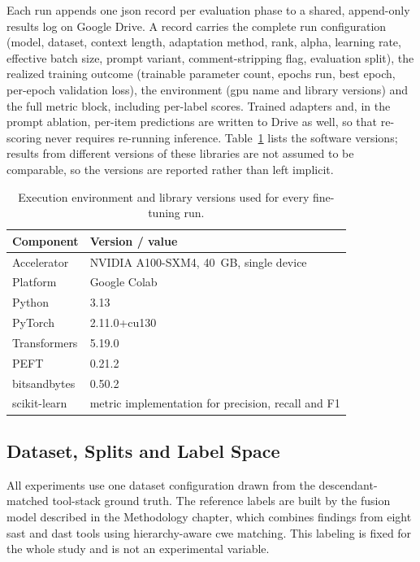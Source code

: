 Each run appends one \gls{json} record per evaluation phase to a shared, append-only results log on Google Drive. A record carries the complete run configuration (model, dataset, context length, adaptation method, rank, alpha, learning rate, effective batch size, prompt variant, comment-stripping flag, evaluation split), the realized training outcome (trainable parameter count, epochs run, best epoch, per-epoch validation loss), the environment (\gls{gpu} name and library versions) and the full metric block, including per-label scores. Trained adapters and, in the prompt ablation, per-item predictions are written to Drive as well, so that re-scoring never requires re-running inference. Table~\ref{tab:software_env} lists the software versions; results from different versions of these libraries are not assumed to be comparable, so the versions are reported rather than left implicit.

\begin{table}[H]
\centering
\caption{Execution environment and library versions used for every fine-tuning run.}
\label{tab:software_env}
\footnotesize
\begin{tabular}{l l}
\toprule
\textbf{Component} & \textbf{Version / value} \\
\midrule
Accelerator        & NVIDIA A100-SXM4, 40~GB, single device \\
Platform           & Google Colab \\
Python             & 3.13 \\
PyTorch            & 2.11.0+cu130 \\
Transformers       & 5.19.0 \\
PEFT               & 0.21.2 \\
bitsandbytes       & 0.50.2 \\
scikit-learn       & metric implementation for precision, recall and F1 \\
\bottomrule
\end{tabular}
\end{table}

\subsection{Dataset, Splits and Label Space}
\label{sec:dataset_splits}

All experiments use one dataset configuration drawn from the descendant-matched tool-stack ground truth. The reference labels are built by the fusion model described in the Methodology chapter, which combines findings from eight \gls{sast} and \gls{dast} tools using hierarchy-aware \gls{cwe} matching. This labeling is fixed for the whole study and is not an experimental variable.


